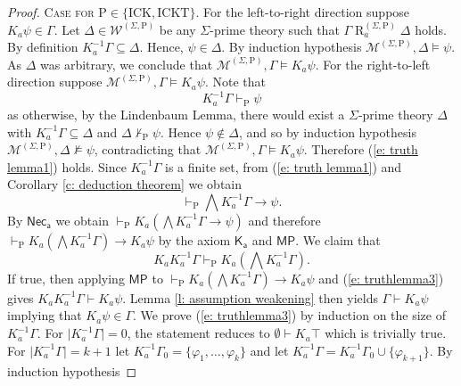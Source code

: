 \documentclass[10pt,a4paper]{amsart}
\newcommand{\K}{K}
\newcommand{\Rel}{\mathrel{R}}
\newcommand{\W}{\mathcal{W}}
\newcommand{\agi}{a}
\newcommand{\fw}{\mathcal{M}}
\newcommand{\hick}{\mathrm{ICK}}
\newcommand{\hickp}{\mathrm{P}}
\newcommand{\hickt}{\mathrm{ICKT}}
\begin{document}
\begin{proof}
    \setlength{\leftskip}{0.5cm} \noindent \textsc{Case for $\hickp \in \{\hick, \hickt\}$}.  For the left-to-right direction suppose $\K_\agi \psi \in \Gamma$. Let $\Delta \in \W^{(\Sigma, \hickp)}$ be any $\Sigma$-prime theory such that $\Gamma \Rel_\agi^{(\Sigma, \hickp)} \Delta$ holds. By definition $\K_\agi^{-1} \Gamma \subseteq \Delta$. Hence, $\psi \in \Delta$. By induction hypothesis $\fw^{(\Sigma, \hickp)}, \Delta \models \psi$. As $\Delta$ was arbitrary, we conclude that $\fw^{(\Sigma, \hickp)}, \Gamma \models \K_\agi \psi$. For the right-to-left direction suppose $\fw^{(\Sigma, \hickp)}, \Gamma \models \K_\agi \psi$. Note that
    \begin{equation}\label{e: truth lemma1}
        \K_\agi^{-1} \Gamma \vdash_\mathrm{P} \psi
    \end{equation}
     as otherwise, by the Lindenbaum Lemma, there would exist a $\Sigma$-prime theory $\Delta$ with $\K_\agi^{-1} \Gamma \subseteq \Delta$ and $\Delta \not \vdash_\mathrm{P} \psi$. Hence $\psi \not \in \Delta$, and so by induction hypothesis $\fw^{(\Sigma, \hickp)}, \Delta \not \models \psi$, contradicting that $\fw^{(\Sigma, \hickp)}, \Gamma \models \K_\agi \psi$. Therefore (\ref{e: truth lemma1}) holds. Since $\K_\agi^{-1}\Gamma$ is a finite set, from (\ref{e: truth lemma1}) and Corollary \ref{c: deduction theorem} we obtain
    \begin{equation}\label{e: truthlemma2}
        \vdash_\mathrm{P} \bigwedge \K_\agi^{-1} \Gamma \rightarrow \psi.
    \end{equation}
    By $\mathsf{Nec_\agi}$ we obtain $\vdash_\mathrm{P} \K_\agi (\bigwedge \K_\agi^{-1} \Gamma \rightarrow \psi) $ and therefore $\vdash_\mathrm{P} \K_\agi (\bigwedge \K_\agi^{-1} \Gamma) \rightarrow \K_\agi \psi$ by the axiom $\mathsf{K_\agi}$ and $\mathsf{MP}$. We claim that
    \begin{equation}\label{e: truthlemma3}
         \K_\agi \K_\agi^{-1} \Gamma \vdash_\mathrm{P} \K_\agi (\bigwedge \K_\agi^{-1} \Gamma).
    \end{equation}
    If true, then applying $\mathsf{MP}$ to $\vdash_\mathrm{P} \K_\agi (\bigwedge \K_\agi^{-1} \Gamma) \rightarrow \K_\agi \psi$ and (\ref{e: truthlemma3}) gives $\K_\agi \K_\agi^{-1} \Gamma \vdash \K_\agi \psi$. Lemma \ref{l: assumption weakening} then yields $\Gamma \vdash \K_\agi \psi$ implying that $\K_\agi \psi \in \Gamma$. We prove (\ref{e: truthlemma3}) by induction on the size of $\K_\agi^{-1} \Gamma$. For $\lvert \K_\agi^{-1} \Gamma \rvert = 0$, the statement reduces to $\emptyset \vdash \K_\agi \top$ which is trivially true. For $\lvert \K_\agi^{-1} \Gamma \rvert = k+1$ let $\K_\agi^{-1}\Gamma_0 = \{ \varphi_1, \ldots, \varphi_k\}$ and let $\K_\agi^{-1}\Gamma = \K_\agi^{-1} \Gamma_0 \cup \{ \varphi_{k+1}\}$. By induction hypothesis

\end{proof}
\end{document}
